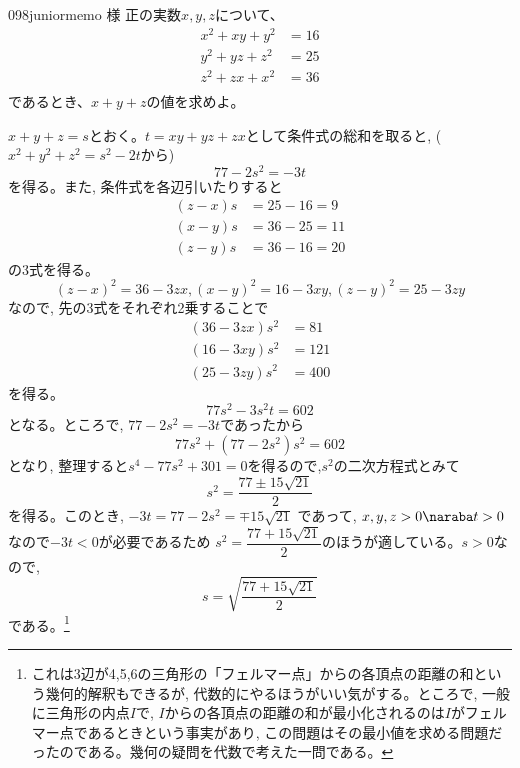 \begin{prob}{098}{}{juniormemo 様}
 正の実数$x, y, z$について、
 \begin{align*}
  x^2+xy+y^2&=16 \\
  y^2+yz+z^2&=25 \\
  z^2+zx+x^2&=36 \\
 \end{align*}
 であるとき、$x+y+z$の値を求めよ。
\end{prob}

$x+y+z=s$とおく。$t=xy+yz+zx$として条件式の総和を取ると, ($x^2+y^2+z^2=s^2-2t$から)
\[77-2s^2=-3t\]
を得る。また, 条件式を各辺引いたりすると
\begin{align*}
 (z-x)s&=25-16=9 \\
 (x-y)s&=36-25=11 \\
 (z-y)s&=36-16=20
\end{align*}
の3式を得る。
\[(z-x)^2=36-3zx, (x-y)^2=16-3xy, (z-y)^2=25-3zy\]
なので, 先の3式をそれぞれ2乗することで
\begin{align*}
 (36-3zx)s^2&=81 \\
 (16-3xy)s^2&=121 \\
 (25-3zy)s^2&=400
\end{align*}
を得る。
\[77s^2-3s^2t=602\]
となる。ところで, $77-2s^2=-3t$であったから
\[77s^2+(77-2s^2)s^2=602\]
となり, 整理すると$s^4-77s^2+301=0$を得るので,$s^2$の二次方程式とみて
\[s^2=\dfrac{77\pm 15\sqrt{21}}{2}\]
を得る。このとき, $-3t=77-2s^2=\mp 15\sqrt{21}$ であって, $x,y,z>0\naraba t>0$なので$-3t<0$が必要であるため $s^2=\dfrac{77+15\sqrt{21}}{2}$のほうが適している。$s>0$なので, 
\[s=\sqrt{\dfrac{77+15\sqrt{21}}{2}}\]
である。\footnote{これは3辺が4,5,6の三角形の「フェルマー点」からの各頂点の距離の和という幾何的解釈もできるが, 代数的にやるほうがいい気がする。ところで, 一般に三角形の内点$I$で, $I$からの各頂点の距離の和が最小化されるのは$I$がフェルマー点であるときという事実があり, この問題はその最小値を求める問題だったのである。幾何の疑問を代数で考えた一問である。}

